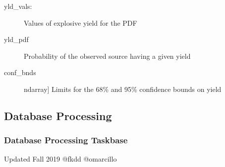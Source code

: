 \documentclass[letterpaper,10pt,english]{sphinxmanual}
\begin{document}
\begin{fulllineitems}
\begin{description}
\begin{description}
\end{description}

\end{description}
\begin{description}
\item[{yld\_vals: }] \leavevmode
Values of explosive yield for the PDF

\item[{yld\_pdf}] \leavevmode{[}{]}
Probability of the observed source having a given yield

\item[{conf\_bnds}] \leavevmode{[}ndarray{]}
Limits for the 68\% and 95\% confidence bounds on yield

\end{description}

\end{fulllineitems}



\subsection{Database Processing}
\label{\detokenize{infrapy.database:module-infrapy.database}}\label{\detokenize{infrapy.database:database-processing}}\label{\detokenize{infrapy.database::doc}}

\subsubsection{Database Processing Taskbase}
\label{\detokenize{infrapy.database.taskbase:database-processing-taskbase}}\label{\detokenize{infrapy.database.taskbase::doc}}\label{\detokenize{infrapy.database.taskbase:module-infrapy.database.taskbase.fdet}}
Updated Fall 2019
@fkdd @omarcillo
\end{document}
